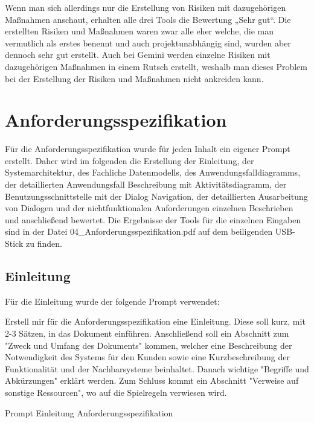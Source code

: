 Wenn man sich allerdings nur die Erstellung von Risiken mit dazugehörigen Maßnahmen anschaut, erhalten alle drei 
Tools die Bewertung „Sehr gut“. Die erstellten Risiken und Maßnahmen waren zwar alle eher welche, die man vermutlich 
als erstes benennt und auch projektunabhängig sind, wurden aber dennoch sehr gut erstellt. Auch bei Gemini werden 
einzelne Risiken mit dazugehörigen Maßnahmen in einem Rutsch erstellt, weshalb man dieses Problem bei der Erstellung 
der Risiken und Maßnahmen nicht ankreiden kann.

\section{Anforderungsspezifikation}  \label{CompAnforderungsspezifikation}

Für die Anforderungsspezifikation wurde für jeden Inhalt ein eigener Prompt erstellt. Daher wird im folgenden die Erstellung der Einleitung, 
der Systemarchitektur, des Fachliche Datenmodells, des Anwendungsfalldiagramms, der detaillierten Anwendungsfall Beschreibung mit Aktivitätsdiagramm, 
der Benutzungsschnittstelle mit der Dialog Navigation, der detaillierten Ausarbeitung von Dialogen und der nichtfunktionalen Anforderungen einzelnen
Beschrieben und anschließend bewertet. Die Ergebnisse der Tools für die einzelnen Eingaben sind in der Datei 04\_Anforderungsspezifikation.pdf auf 
dem beiligenden USB-Stick zu finden.

\subsection*{Einleitung}

Für die Einleitung wurde der folgende Prompt verwendet:

\begin{prompt}[H]
    \begin{tcolorbox}[colback=gray!20, colframe=gray!20, boxrule=0pt, sharp corners] 
        Erstell mir für die Anforderungsspezifikation eine Einleitung. Diese soll kurz, mit 2-3 Sätzen, in das Dokument einführen. Anschließend soll 
        ein Abschnitt zum "Zweck und Umfang des Dokuments" kommen, welcher eine Beschreibung der Notwendigkeit des Systems für den Kunden sowie eine 
        Kurzbeschreibung der Funktionalität und der Nachbarsysteme beinhaltet. Danach wichtige "Begriffe und Abkürzungen" erklärt werden. Zum Schluss 
        kommt ein Abschnitt "Verweise auf sonstige Ressourcen", wo auf die Spielregeln verwiesen wird.
        \vfill
    \end{tcolorbox}
    \caption{Prompt Einleitung Anforderungsspezifikation}
    \label{Prompt Einleitung Anforderungsspezifikation}
\end{prompt}

